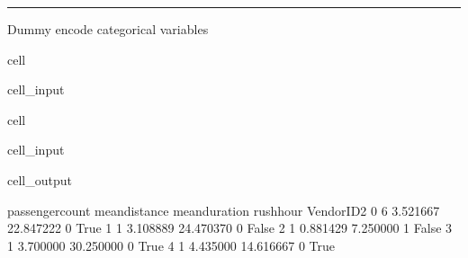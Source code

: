 \documentclass[letterpaper,10pt,english]{sphinxmanual}
\begin{document}
\bigskip\hrule\bigskip


\sphinxAtStartPar
{}

\sphinxAtStartPar
Dummy encode categorical variables

\begin{sphinxuseclass}{cell}
\begin{sphinxuseclass}{cell_input}
\begin{sphinxVerbatim}[commandchars=\\\{\}]
\PYG{p}{[}\PYG{p}{]}  \PYG{p}{[}\PYG{p}{]}

    
\end{sphinxVerbatim}

\end{sphinxuseclass}
\end{sphinxuseclass}
\begin{sphinxuseclass}{cell}
\begin{sphinxuseclass}{cell_input}
\begin{sphinxVerbatim}[commandchars=\\\{\}]
\end{sphinxVerbatim}

\end{sphinxuseclass}
\begin{sphinxuseclass}{cell_output}
\begin{sphinxVerbatim}[commandchars=\\\{\}]
   passenger\PYGZus{}count  mean\PYGZus{}distance  mean\PYGZus{}duration  rush\PYGZus{}hour  VendorID\PYGZus{}2
0                6       3.521667      22.847222          0        True
1                1       3.108889      24.470370          0       False
2                1       0.881429       7.250000          1       False
3                1       3.700000      30.250000          0        True
4                1       4.435000      14.616667          0        True
\end{sphinxVerbatim}

\end{sphinxuseclass}
\end{sphinxuseclass}
\end{document}
